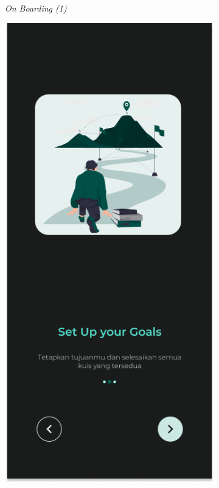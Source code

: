 \begin{figure}[H]
\begin{subfigure}[b]{0.25\textwidth}
	  \caption{\textit{On Boarding (1)}}
	  \label{fig:HasilBoarding1-dt}
	\end{subfigure}
	\begin{subfigure}[b]{0.25\textwidth}
		\centering
	  \includegraphics[width=\linewidth]{contents/chapter-3/images/HF-Boarding-2-dt.png}

\end{subfigure}
\end{figure}
